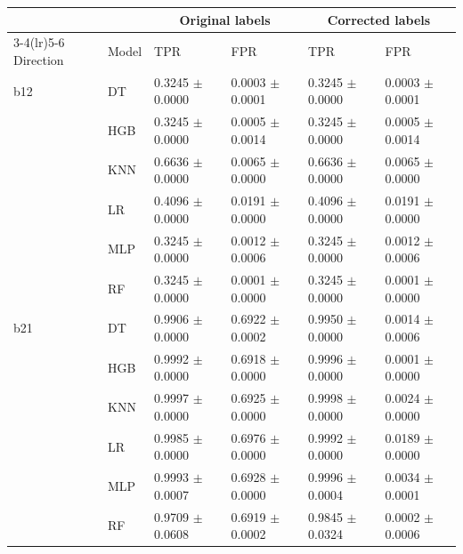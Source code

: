 \begin{tabular}{ll llll}
\toprule
& & \multicolumn{2}{c}{Original labels} & \multicolumn{2}{c}{Corrected labels}\\
\cmidrule(lr){3-4}\cmidrule(lr){5-6}
Direction & Model & TPR & FPR & TPR & FPR\\
\midrule
b12 & DT & 0.3245 $\pm$ 0.0000 & 0.0003 $\pm$ 0.0001 & 0.3245 $\pm$ 0.0000 & 0.0003 $\pm$ 0.0001\\
 & HGB & 0.3245 $\pm$ 0.0000 & 0.0005 $\pm$ 0.0014 & 0.3245 $\pm$ 0.0000 & 0.0005 $\pm$ 0.0014\\
 & KNN & 0.6636 $\pm$ 0.0000 & 0.0065 $\pm$ 0.0000 & 0.6636 $\pm$ 0.0000 & 0.0065 $\pm$ 0.0000\\
 & LR & 0.4096 $\pm$ 0.0000 & 0.0191 $\pm$ 0.0000 & 0.4096 $\pm$ 0.0000 & 0.0191 $\pm$ 0.0000\\
 & MLP & 0.3245 $\pm$ 0.0000 & 0.0012 $\pm$ 0.0006 & 0.3245 $\pm$ 0.0000 & 0.0012 $\pm$ 0.0006\\
 & RF & 0.3245 $\pm$ 0.0000 & 0.0001 $\pm$ 0.0000 & 0.3245 $\pm$ 0.0000 & 0.0001 $\pm$ 0.0000\\
\midrule
b21 & DT & 0.9906 $\pm$ 0.0000 & 0.6922 $\pm$ 0.0002 & 0.9950 $\pm$ 0.0000 & 0.0014 $\pm$ 0.0006\\
 & HGB & 0.9992 $\pm$ 0.0000 & 0.6918 $\pm$ 0.0000 & 0.9996 $\pm$ 0.0000 & 0.0001 $\pm$ 0.0000\\
 & KNN & 0.9997 $\pm$ 0.0000 & 0.6925 $\pm$ 0.0000 & 0.9998 $\pm$ 0.0000 & 0.0024 $\pm$ 0.0000\\
 & LR & 0.9985 $\pm$ 0.0000 & 0.6976 $\pm$ 0.0000 & 0.9992 $\pm$ 0.0000 & 0.0189 $\pm$ 0.0000\\
 & MLP & 0.9993 $\pm$ 0.0007 & 0.6928 $\pm$ 0.0000 & 0.9996 $\pm$ 0.0004 & 0.0034 $\pm$ 0.0001\\
 & RF & 0.9709 $\pm$ 0.0608 & 0.6919 $\pm$ 0.0002 & 0.9845 $\pm$ 0.0324 & 0.0002 $\pm$ 0.0006\\
\bottomrule
\end{tabular}

